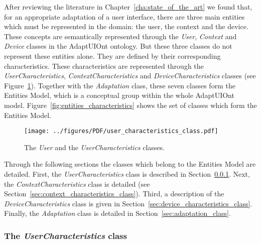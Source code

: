 After reviewing the literature in Chapter~\ref{cha:state_of_the_art} we found
that, for an appropriate adaptation of a user interface, there are three main
entities which must be represented in the domain: the user, the context and the
device. These concepts are semantically represented through the \textit{User},
\textit{Context} and \textit{Device} classes in the AdaptUIOnt ontology. But 
these three classes do not represent these entities alone. They are defined by 
their corresponding characteristics. These characteristics are represented through 
the \textit{UserCharacteristics}, \textit{ContextCharacteristics} and
\textit{DeviceCharacteristics} classes (see Figure~\ref{fig:user_characteristics_class}).
Together with the \textit{Adaptation} class, these seven classes form the Entities
Model, which is a conceptual group within the whole AdaptUIOnt model.
Figure~\ref{fig:entities_characteristics} shows the set of classes which form
the Entities Model.

\begin{figure}[H]
\centering
\texttt{[image: ../figures/PDF/user\_characteristics\_class.pdf]}
\caption{The \textit{User} and the \textit{UserCharacteristics} classes.}
\label{fig:user_characteristics_class}
\end{figure}

Through the following sections the classes which belong to the Entities Model
are detailed. First, the \textit{UserCharacteristics} class is described in
Section~\ref{sec:user_characteristics_class}. Next, the \textit{ContextCharacteristics}
class is detailed (see Section~\ref{sec:context_characteristics_class}). Third,
a description of the \textit{DeviceCharacteristics} class is given in
Section~\ref{sec:device_characteristics_class}. Finally, the \textit{Adaptation}
class is detailed in Section~\ref{sec:adaptation_class}.


\subsubsection{The \textit{UserCharacteristics} class}
\label{sec:user_characteristics_class}

